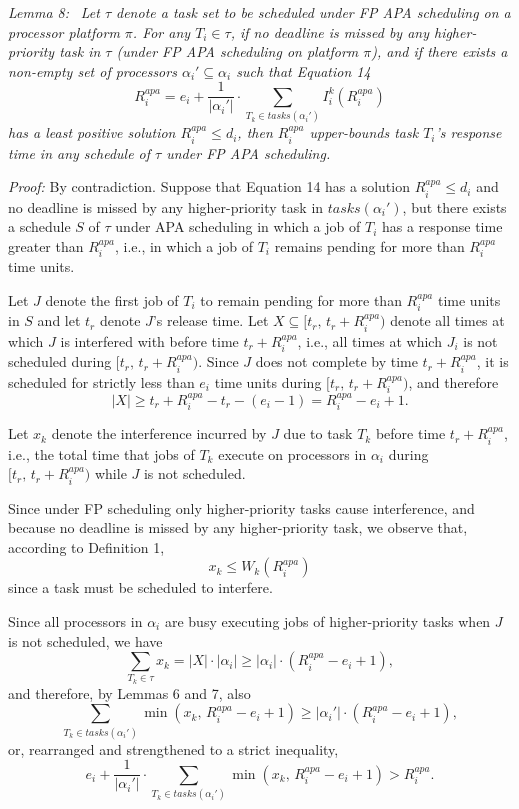 \textit{Lemma 8:} \ \textit{Let $\tau$ denote a task set to be scheduled under FP APA scheduling on a processor platform $\pi$. For any $T_i \in \tau$, if no deadline is missed by any higher-priority task in $\tau$ (under FP APA scheduling on platform $\pi$), and if there exists a non-empty set of processors $\alpha_i' \subseteq \alpha_i$ such that Equation 14}
\[
R_i^{apa} = e_i + \frac{1}{|\alpha_i'|}\cdot \sum_{T_k \in tasks(\alpha_i')} I_i^k(R_i^{apa})
\tag{14}
\]
\textit{has a least positive solution $R_i^{apa} \leq d_i$, then $R_i^{apa}$ upper-bounds task $T_i$'s response time in any schedule of $\tau$ under FP APA scheduling.}

\bigskip

\noindent
\textit{Proof:} By contradiction. Suppose that Equation 14 has a solution $R_i^{apa} \leq d_i$ and no deadline is missed by any higher-priority task in $tasks(\alpha_i')$, but there exists a schedule $S$ of $\tau$ under APA scheduling in which a job of $T_i$ has a response time greater than $R_i^{apa}$, i.e., in which a job of $T_i$ remains pending for more than $R_i^{apa}$ time units.

Let $J$ denote the first job of $T_i$ to remain pending for more than $R_i^{apa}$ time units in $S$ and let $t_r$ denote $J$'s release time. Let $X \subseteq [t_r,\, t_r + R_i^{apa})$ denote all times at which $J$ is interfered with before time $t_r + R_i^{apa}$, i.e., all times at which $J_i$ is not scheduled during $[t_r,\, t_r + R_i^{apa})$. Since $J$ does not complete by time $t_r + R_i^{apa}$, it is scheduled for strictly less than $e_i$ time units during $[t_r,\, t_r + R_i^{apa})$, and therefore
\[
|X| \geq t_r + R_i^{apa} - t_r - (e_i - 1) = R_i^{apa} - e_i + 1.
\]

Let $x_k$ denote the interference incurred by $J$ due to task $T_k$ before time $t_r + R_i^{apa}$, i.e., the total time that jobs of $T_k$ execute on processors in $\alpha_i$ during $[t_r,\, t_r + R_i^{apa})$ while $J$ is not scheduled.

Since under FP scheduling only higher-priority tasks cause interference, and because no deadline is missed by any higher-priority task, we observe that, according to Definition 1,
\[
x_k \leq W_k(R_i^{apa})
\tag{15}
\]
since a task must be scheduled to interfere.

Since all processors in $\alpha_i$ are busy executing jobs of higher-priority tasks when $J$ is not scheduled, we have
\[
\sum_{T_k \in \tau} x_k = |X| \cdot |\alpha_i| \geq |\alpha_i| \cdot (R_i^{apa} - e_i + 1),
\]
and therefore, by Lemmas 6 and 7, also
\[
\sum_{T_k \in tasks(\alpha_i')} \min(x_k,\, R_i^{apa} - e_i + 1) \geq |\alpha_i'| \cdot (R_i^{apa} - e_i + 1),
\]
or, rearranged and strengthened to a strict inequality,
\[
e_i + \frac{1}{|\alpha_i'|} \cdot \sum_{T_k \in tasks(\alpha_i')} \min(x_k,\, R_i^{apa} - e_i + 1) > R_i^{apa}.
\]

